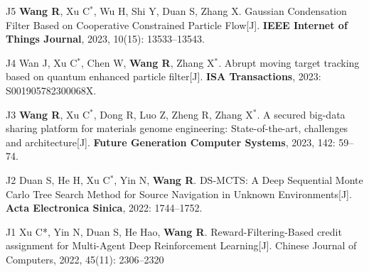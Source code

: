         
        \pub
        {J5}
        {\textbf{Wang R}, Xu C$^*$, Wu H, Shi Y, Duan S, Zhang X. Gaussian Condensation Filter Based on Cooperative Constrained Particle Flow[J]. \textbf{IEEE Internet of Things Journal}, 2023, 10(15): 13533–13543.}
               
        \pub
        {J4}
        {Wan J, Xu C$^*$, Chen W, \textbf{Wang R}, Zhang X$^*$. Abrupt moving target tracking based on quantum enhanced particle filter[J]. \textbf{ISA Transactions}, 2023: S001905782300068X.}
        
        \pub
        {J3}
        {\textbf{Wang R}, Xu C$^*$, Dong R, Luo Z, Zheng R, Zhang X$^*$. A secured big-data sharing platform for materials genome engineering: State-of-the-art, challenges and architecture[J]. \textbf{Future Generation Computer Systems}, 2023, 142: 59–74.}
        
        
        \pub
        {J2}
        {Duan S, He H, Xu C$^*$, Yin N, \textbf{Wang R}. DS-MCTS: A Deep Sequential Monte Carlo Tree Search Method for Source Navigation in Unknown Environments[J]. \textbf{Acta Electronica Sinica}, 2022: 1744–1752.}
        
         \pub
        {J1}
        {Xu C*, Yin N, Duan S, He Hao, \textbf{Wang R}. Reward-Filtering-Based credit assignment for Multi-Agent Deep Reinforcement Learning[J]. Chinese Journal of Computers, 2022, 45(11): 2306–2320}
   
